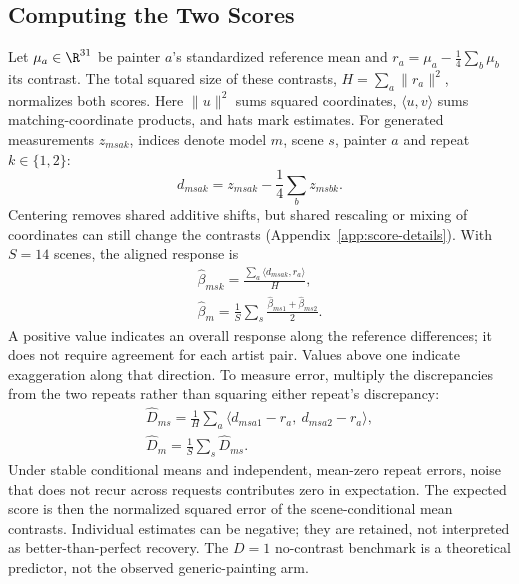 \subsection{Computing the Two Scores}
Let $\mu_a\in\R^{31}$ be painter $a$'s standardized reference mean and
$r_a=\mu_a-\frac14\sum_b\mu_b$ its contrast. The total squared size of these
contrasts, $H=\sum_a\|r_a\|^2$, normalizes both scores. Here $\|u\|^2$ sums squared
coordinates, $\langle u,v\rangle$ sums matching-coordinate products, and
hats mark estimates. For generated measurements $z_{msak}$, indices denote
model $m$, scene $s$, painter $a$ and repeat $k\in\{1,2\}$:
\begin{equation}
 d_{msak}=z_{msak}-\frac14\sum_b z_{msbk}.
 \label{eq:center}
\end{equation}
Centering removes shared additive shifts, but shared rescaling or mixing
of coordinates can still change the contrasts
(Appendix~\ref{app:score-details}). With $S=14$ scenes, the aligned response is
\begin{equation}
\begin{gathered}
\widehat\beta_{msk}=\frac{\sum_a\langle d_{msak},r_a\rangle}{H},\\
\widehat\beta_m=\frac1S\sum_s\frac{\widehat\beta_{ms1}+\widehat\beta_{ms2}}2.
\end{gathered}
\label{eq:beta}
\end{equation}
A positive value indicates an overall response along the reference differences;
it does not require agreement for each artist pair. Values above one indicate
exaggeration along that direction. To measure error, multiply the discrepancies
from the two repeats rather than squaring either repeat's discrepancy:
\begin{equation}
\begin{gathered}
\widehat D_{ms}=\frac1H\sum_a
\langle d_{msa1}-r_a,\ d_{msa2}-r_a\rangle,\\
\widehat D_m=\frac1S\sum_s\widehat D_{ms}.
\end{gathered}
\label{eq:distortion}
\end{equation}
Under stable conditional means and independent, mean-zero repeat errors,
noise that does not recur across requests contributes zero in expectation.
The expected score is then the normalized squared error of the scene-conditional
mean contrasts. Individual estimates can be negative; they are retained, not
interpreted as better-than-perfect recovery. The $D=1$ no-contrast benchmark
is a theoretical predictor, not the observed generic-painting arm.


